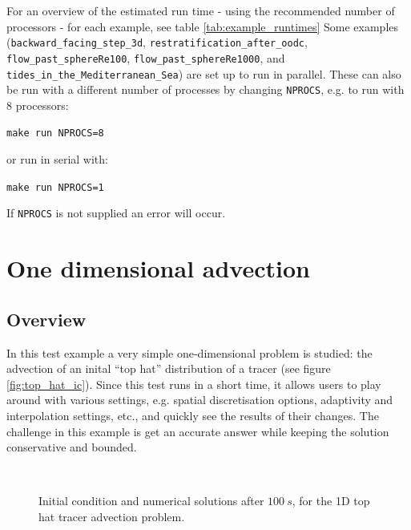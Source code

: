 For an overview of the estimated run time - using the recommended number of processors - for each
example, see table \ref{tab:example_runtimes}
Some examples (\texttt{backward\_facing\_step\_3d}, \texttt{restratification\_after\_oodc}, 
\texttt{flow\_past\_sphereRe100}, \texttt{flow\_past\_sphereRe1000},
and \texttt{tides\_in\_the\_Mediterranean\_Sea})
are set up to run in parallel. These can also be run with a different number 
of processes by changing \texttt{NPROCS}, e.g. to run with 8 processors:

\hspace{0.05\textwidth}\texttt{make run NPROCS=8}

or run in serial with:

\hspace{0.05\textwidth}\texttt{make run NPROCS=1}

If \texttt{NPROCS} is not supplied an error will occur.


\section{One dimensional advection}
\label{sec:oned_advection}
\subsection{Overview}
In this test example a very simple one-dimensional problem is 
studied: the advection of an inital ``top hat'' distribution 
of a tracer (see figure \ref{fig:top_hat_ic}). Since this test runs in a  
short time, it allows users to play around with various
settings, e.g. spatial discretisation options, adaptivity 
and interpolation settings, etc., and quickly see the results
of their changes. The challenge in this example is get an accurate
answer while keeping the solution conservative and bounded.

\begin{figure}
  \centering
    \label{fig:top_hat_ic}
    \label{fig:top_hat_cg_example} \\
    \label{fig:top_hat_dg}
    \label{fig:top_hat_cv}
  \caption{Initial condition and numerical solutions after $100~s$, for the 1D top hat tracer advection problem.}
\end{figure}

